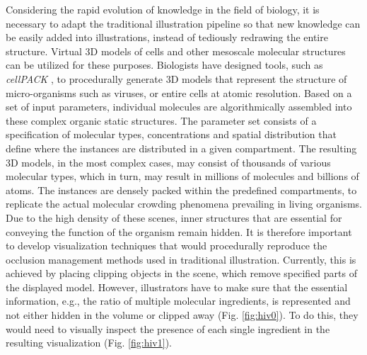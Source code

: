 Considering the rapid evolution of knowledge in the field of biology, it is necessary to adapt the traditional illustration pipeline so that new knowledge can be easily added into illustrations, instead of tediously redrawing the entire structure.
Virtual 3D models of cells and other mesoscale molecular structures can be utilized for these purposes.
Biologists have designed tools, such as \emph{cellPACK} \cite{cellpack}, to procedurally generate 3D models that represent the structure of micro-organisms such as viruses, or entire cells at atomic resolution.
Based on a set of input parameters, individual molecules are algorithmically assembled into these complex organic static structures. 
The parameter set consists of a specification of molecular types, concentrations and spatial distribution that define where the instances are distributed in a given compartment. 
The resulting 3D models, in the most complex cases, may consist of thousands of various molecular types, which in turn, may result in millions of molecules and billions of atoms.
The instances are densely packed within the predefined compartments, to replicate the actual molecular crowding phenomena prevailing in living organisms.
Due to the high density of these scenes, inner structures that are essential for conveying the function of the organism remain hidden.
It is therefore important to develop visualization techniques that would procedurally reproduce the occlusion management methods used in traditional illustration.
Currently, this is achieved by placing clipping objects in the scene, which remove specified parts of the displayed model. 
However, illustrators have to make sure that the essential information, e.g., the ratio of multiple molecular ingredients, is represented and not either hidden in the volume or clipped away (Fig. \ref{fig:hiv0}). 
To do this, they would need to visually inspect the presence of each single ingredient in the resulting visualization (Fig. \ref{fig:hiv1}).

